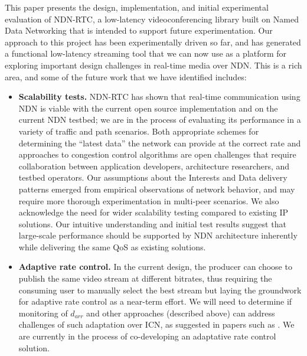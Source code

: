 \documentclass{icn/sig-alternate-2013} %
\newcommand{\ndnrtcName}{NDN-RTC} %
\begin{document}
This paper presents the design, implementation, and initial experimental evaluation of \ndnrtcName{}, a low-latency videoconferencing library built on Named Data Networking that is intended to support future experimentation.   Our approach to this project has been experimentally driven so far, and has generated a functional low-latency streaming tool that we can now use as a platform for exploring important design challenges in real-time media over NDN.  This is a rich area, and some of the future work that we have identified includes: 
\begin{itemize}[label={}]

\item \textbf{Scalability tests.} \ndnrtcName{} has shown that real-time communication using NDN is viable with the current open source implementation and on the current NDN testbed;  we are in the process of evaluating its performance in a variety of traffic and path scenarios. Both appropriate schemes for determining the ``latest data'' the network can provide at the correct rate and approaches to congestion control algorithms are open challenges that require collaboration between application developers, architecture researchers, and testbed operators. Our assumptions about the Interests and Data delivery patterns emerged from empirical observations of network behavior, and may require more thorough experimentation in multi-peer scenarios. We also acknowledge the need for wider scalability testing compared to existing IP solutions. Our intuitive understanding and initial test results suggest that large-scale performance should be supported by NDN architecture inherently while delivering the same QoS as existing solutions.

\item \textbf{Adaptive rate control.} In the current design, the producer can choose to publish the same video stream at different bitrates, thus requiring the consuming user to manually select the best stream but laying the groundwork for adaptive rate control as a near-term effort. We will need to determine if monitoring of $d_{arr}$ and other approaches (described above) can address challenges of such adaptation over ICN, as suggested in papers such as \cite{posch2014client}.  We are currently in the process of co-developing an adaptative rate control solution. 



\end{itemize}
\end{document}
